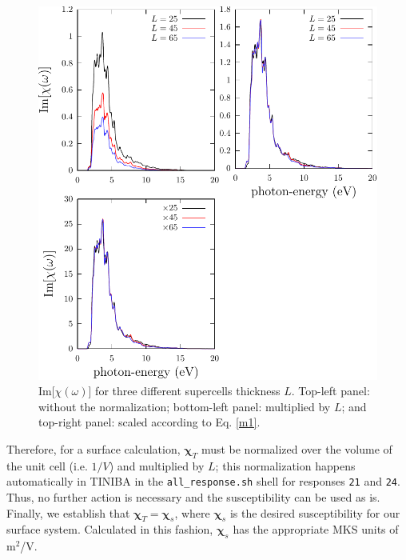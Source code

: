 \documentclass[letterpaper,10pt]{article}
\begin{document}
\begin{figure}[h]
\begin{center}
\includegraphics[scale=0.6]{plots/chi-layer}
\end{center}
\caption{Im[$\chi(\omega)$] for three different supercells thickness $L$.
Top-left panel: without the normalization; bottom-left panel: multiplied by $L$;
and top-right panel: scaled according to Eq. \eqref{m1}. }
\label{chil}
\end{figure}

Therefore, for a surface calculation, $\boldsymbol{\chi}_{T}$ must be normalized
over the volume of the unit cell (i.e. $1/V$) and multiplied by $L$; this
normalization happens automatically in TINIBA in the \verb=all_response.sh=
shell for responses \verb=21= and \verb=24=. Thus, no further action is
necessary and the susceptibility can be used as is. Finally, we establish that
$\boldsymbol{\chi}_{T} = \boldsymbol{\chi}_{s}$, where $\boldsymbol{\chi}_{s}$
is the desired susceptibility for our surface system. Calculated in this
fashion, $\boldsymbol{\chi}_{s}$ has the appropriate MKS units of m$^{2}$/V.

\end{document}

